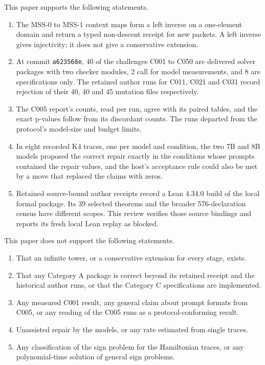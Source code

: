 \documentclass[
  11pt,
]{article}
\newcommand{\passthrough}[1]{#1}
\providecommand{\tightlist}{%
  \setlength{\itemsep}{0pt}\setlength{\parskip}{0pt}}
\begin{document}
This paper supports the following statements.

\begin{enumerate}
\def\labelenumi{\arabic{enumi}.}
\tightlist
\item
  The MSS-0 to MSS-1 context maps form a left inverse on a one-element
  domain and return a typed non-descent receipt for new packets. A left
  inverse gives injectivity; it does not give a conservative extension.
\item
  At commit \passthrough{\lstinline!a623568e!}, 40 of the challenges
  C001 to C050 are delivered solver packages with two checker modules, 2
  call for model measurements, and 8 are specifications only. The
  retained author runs for C011, C021 and C031 record rejection of their
  40, 40 and 45 mutation files respectively.
\item
  The C005 report's counts, read per run, agree with its paired tables,
  and the exact p-values follow from its discordant counts. The runs
  departed from the protocol's model-size and budget limits.
\item
  In eight recorded K4 traces, one per model and condition, the two 7B
  and 8B models proposed the correct repair exactly in the conditions
  whose prompts contained the repair values, and the host's acceptance
  rule could also be met by a move that replaced the claims with zeros.
\item
  Retained source-bound author receipts record a Lean 4.34.0 build of
  the local formal package. Its 39 selected theorems and the broader
  576-declaration census have different scopes. This review verifies
  those source bindings and reports its fresh local Lean replay as
  blocked.
\end{enumerate}

This paper does not support the following statements.

\begin{enumerate}
\def\labelenumi{\arabic{enumi}.}
\tightlist
\item
  That an infinite tower, or a conservative extension for every stage,
  exists.
\item
  That any Category A package is correct beyond its retained receipt and
  the historical author runs, or that the Category C specifications are
  implemented.
\item
  Any measured C001 result, any general claim about prompt formats from
  C005, or any reading of the C005 runs as a protocol-conforming result.
\item
  Unassisted repair by the models, or any rate estimated from single
  traces.
\item
  Any classification of the sign problem for the Hamiltonian traces, or
  any polynomial-time solution of general sign problems.
\end{enumerate}
\end{document}
